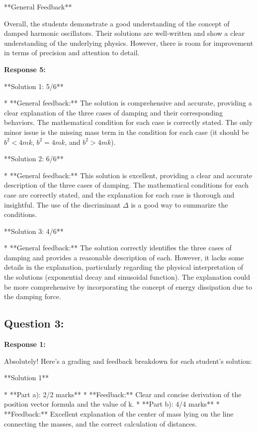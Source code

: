 \documentclass[a4paper,11pt]{article}
\begin{document}
**General Feedback**

Overall, the students demonstrate a good understanding of the concept of damped harmonic oscillators. Their solutions are well-written and show a clear understanding of the underlying physics. However, there is room for improvement in terms of precision and attention to detail.

\bigskip    
\textbf{Response 5:}

**Solution 1: 5/6**

* **General feedback:** The solution is comprehensive and accurate, providing a clear explanation of the three cases of damping and their corresponding behaviors. The mathematical condition for each case is correctly stated. The only minor issue is the missing mass term in the condition for each case (it should be \(b^2 < 4mk\), \(b^2 = 4mk\), and \(b^2 > 4mk\)).


**Solution 2: 6/6**

* **General feedback:** This solution is excellent, providing a clear and accurate description of the three cases of damping. The mathematical conditions for each case are correctly stated, and the explanation for each case is thorough and insightful. The use of the discriminant \(\Delta\) is a good way to summarize the conditions.


**Solution 3: 4/6**

* **General feedback:** The solution correctly identifies the three cases of damping and provides a reasonable description of each. However, it lacks some details in the explanation, particularly regarding the physical interpretation of the solutions (exponential decay and sinusoidal function). The explanation could be more comprehensive by incorporating the concept of energy dissipation due to the damping force.

\subsection*{Question 3:}

\textbf{Response 1:}

Absolutely! Here's a grading and feedback breakdown for each student's solution:

**Solution 1**

* **Part a): 2/2 marks** 
   * **Feedback:** Clear and concise derivation of the position vector formula and the value of k.
* **Part b): 4/4 marks**
   * **Feedback:**  Excellent explanation of the center of mass lying on the line connecting the masses, and the correct calculation of distances. 
\end{document}
